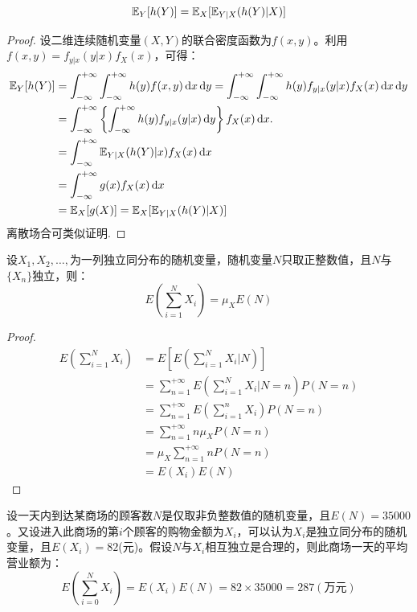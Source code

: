 \begin{theorem}[重期望公式]
    \[ \mathbb{E}_Y[h(Y)] = \mathbb{E}_X[\mathbb{E}_{Y|X}(h(Y)|X)] \]
\end{theorem}
\begin{proof}
    设二维连续随机变量$(X,Y)$的联合密度函数为$f(x,y)$。利用$f(x,y)=f_{y|x}(y|x)f_X(x)$，可得：
    \begin{align*}
        \E_Y[h(Y)] & = \int_{-\infty}^{+\infty} \int_{-\infty}^{+\infty} h(y) f(x, y) \dd x \dd y=
        \int_{-\infty}^{+\infty} \int_{-\infty}^{+\infty} h(y) f_{y|x}(y|x)f_X(x) \dd x \dd y                   \\
                   & = \int_{-\infty}^{+\infty}\left\{\int_{-\infty}^{+\infty} h(y) f_{y|x}(y|x) \dd y \right\}
        f_X(x) \dd x.                                                                                           \\
                   & =\int_{-\infty}^{+\infty} \E_{Y|X}(h(Y)|x) f_X(x) \dd x                                    \\
                   & =\int_{-\infty}^{+\infty} g(x) f_X(x) \dd x                                                \\
                   & =\E_X[g(X)]=\E_X[\E_{Y|X}(h(Y)|X)]
    \end{align*}
    离散场合可类似证明.
\end{proof}

\begin{proposition}[随机个随机变量和的数学期望]
    设$X_1,X_2,\ldots,$为一列独立同分布的随机变量，随机变量$N$只取正整数值，且$N$与$\{X_n\}$独立，则：
    \[ E\left(\sum_{i=1}^N X_i\right)=\mu_X E(N) \]
\end{proposition}
\begin{proof}
    \begin{align*}
        E\left(\sum_{i=1}^N X_i\right) & =E\left[E\left(\sum_{i=1}^{N} X_{i} | N\right)\right]             \\
                                       & =\sum_{n=1}^{+\infty} E\left(\sum_{i=1}^N X_i | N=n\right) P(N=n) \\
                                       & =\sum_{n=1}^{+\infty} E\left(\sum_{i=1}^n X_i\right) P(N=n)       \\
                                       & =\sum_{n=1}^{+\infty} n \mu_X P(N=n)                              \\
                                       & =\mu_X \sum_{n=1}^{+\infty} n P(N=n)                              \\
                                       & =E(X_i) E(N)
    \end{align*}
\end{proof}
\begin{example}
    设一天内到达某商场的顾客数$N$是仅取非负整数值的随机变量，且$E(N)=35000$。又设进入此商场的第$i$个顾客的购物金额为$X_i$，可以认为$X_i$是独立同分布的随机变量，且$E(X_i)=82$(元)。假设$N$与$X_i$相互独立是合理的，则此商场一天的平均营业额为：
    \[ E\left(\sum_{i=0}^N X_{i}\right)=E(X_i) E(N)=82 \times 35000=287(\text{万元}) \]
\end{example}

